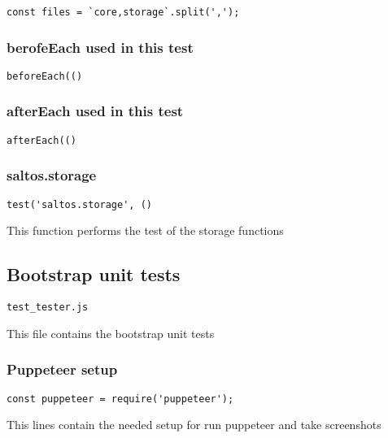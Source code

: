 \documentclass[a4paper]{article}
\begin{document}
\begin{lstlisting}
const files = `core,storage`.split(',');
\end{lstlisting}

\hypertarget{toc258}{}
\subsubsection{berofeEach used in this test}

\begin{lstlisting}
beforeEach(()
\end{lstlisting}

\hypertarget{toc259}{}
\subsubsection{afterEach used in this test}

\begin{lstlisting}
afterEach(()
\end{lstlisting}

\hypertarget{toc260}{}
\subsubsection{saltos.storage}

\begin{lstlisting}
test('saltos.storage', ()
\end{lstlisting}

This function performs the test of the storage functions

\hypertarget{toc261}{}
\subsection{Bootstrap unit tests}

\begin{lstlisting}
test_tester.js
\end{lstlisting}

This file contains the bootstrap unit tests

\hypertarget{toc262}{}
\subsubsection{Puppeteer setup}

\begin{lstlisting}
const puppeteer = require('puppeteer');
\end{lstlisting}

This lines contain the needed setup for run puppeteer and take screenshots
\end{document}
